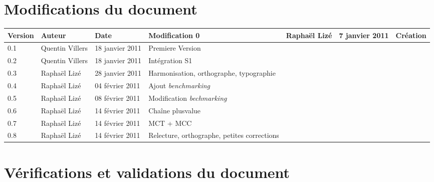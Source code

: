 
\section*{Modifications du document}

\begin{center}
\begin{longtable}{|m{14mm}|m{36mm}|m{36mm}|m{60mm}|}
\hline
Version & Auteur & Date & Modification\endhead \hline
0
& %
Raphaël Lizé
& %
7 janvier 2011
& %
Création
\\\hline
0.1
& %
Quentin Villers
& %
18 janvier 2011
& %
Premiere Version
\\\hline
0.2
& %
Quentin Villers
& %
18 janvier 2011
& %
Intégration S1
\\\hline
0.3
& %
Raphaël Lizé
& %
28 janvier 2011
& %
Harmonisation, orthographe, typographie
\\\hline
0.4
& %
Raphaël Lizé
& %
04 février 2011
& %
Ajout {\sl benchmarking}
\\\hline
0.5
& %
Raphaël Lizé
& %
08 février 2011
& %
Modification {\sl bechmarking}
\\\hline
0.6
& %
Raphaël Lizé
& %
14 février 2011
& %
Chaîne plusvalue
\\\hline
0.7
& %
Raphaël Lizé
& %
14 février 2011
& %
MCT + MCC
\\\hline
0.8
& %
Raphaël Lizé
& %
14 février 2011
& %
Relecture, orthographe, petites corrections
\\\hline

\end{longtable}
\end{center}


\section*{Vérifications et validations du document}

